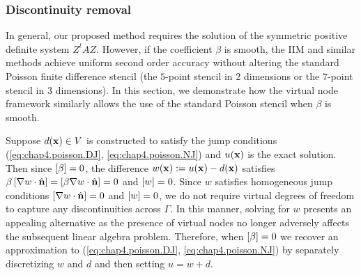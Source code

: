 \subsubsection{Discontinuity removal} \label{subsubsec:chap4.discretization.interface.discontinuityremoval}

In general, our proposed method requires the solution of the symmetric positive definite system $Z^tAZ$. However, if the coefficient $\beta$ is smooth, the IIM and similar methods achieve uniform second order accuracy without altering the standard Poisson finite difference stencil (the $5$-point stencil in $2$ dimensions or the $7$-point stencil in $3$ dimensions). In this section, we demonstrate how the virtual node framework similarly allows the use of the standard Poisson stencil when $\beta$ is smooth.

Suppose $d(\mathbf{x}) \in V$ is constructed to satisfy the jump conditions (\ref{eq:chap4.poisson.DJ}, \ref{eq:chap4.poisson.NJ}) and $u(\mathbf{x})$ is the exact solution. Then since $\left[ \beta \right] = 0$, the difference $w(\mathbf{x}) := u(\mathbf{x}) - d(\mathbf{x})$ satisfies $\beta \left[ \nabla w \cdot \hat{\mathbf{n}} \right] = \left[ \beta \nabla w \cdot \hat{\mathbf{n}} \right] = 0$ and $\left[ w \right] = 0$. Since $w$ satisfies homogeneous jump conditions $\left[ \nabla w \cdot \hat{\mathbf{n}} \right] = 0$ and $\left[ w \right] = 0$, we do not require virtual degrees of freedom to capture any discontinuities across $\Gamma$. In this manner, solving for $w$ presents an appealing alternative as the presence of virtual nodes no longer adversely affects the subsequent linear algebra problem. Therefore, when $\left[ \beta \right] = 0$ we recover an approximation to (\ref{eq:chap4.poisson.DJ}, \ref{eq:chap4.poisson.NJ}) by separately discretizing $w$ and $d$ and then setting $u = w + d$.

